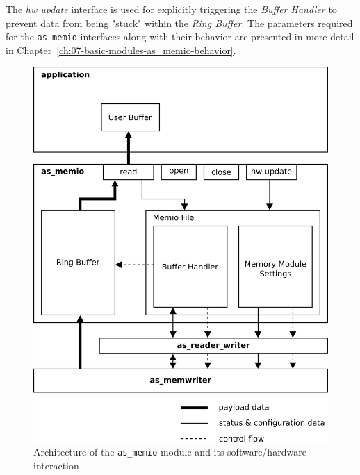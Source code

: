 The \textit{hw update} interface is used for explicitly triggering the \textit{Buffer Handler} to prevent data from being "stuck" within the \textit{Ring Buffer}.
The parameters required for the \texttt{as\_memio} interfaces along with their behavior are presented in more detail in Chapter~\ref{ch:07-basic-modules-as_memio-behavior}.

\begin{figure}[ht]
    \centering
    \includegraphics[width=0.6\linewidth,clip]{figs/memio.png}
    \caption{Architecture of the \texttt{as\_memio} module and its software/hardware interaction}
    \label{fig:memio}
\end{figure}

